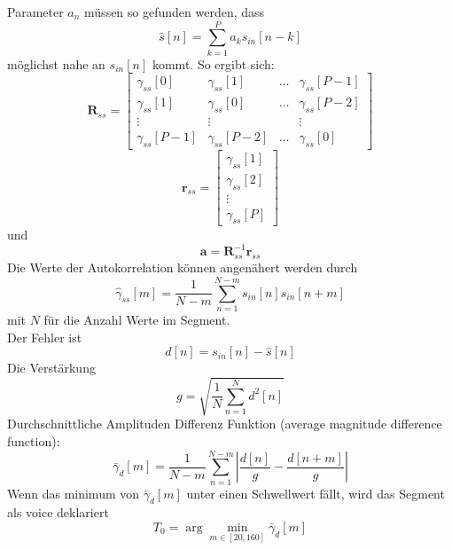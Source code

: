 Parameter $a_n$ müssen so gefunden werden, dass
\[ \hat{s}[n] = \sum_{k=1}^{P}a_ks_{in}[n-k] \]
möglichst nahe an $s_{in}[n]$ kommt. So ergibt sich:
\[ \textbf{R}_{ss} = \begin{bmatrix}
	\gamma_{ss}[0]	& \gamma_{ss}[1]	& \ldots	& \gamma_{ss}[P-1]\\
	\gamma_{ss}[1]	& \gamma_{ss}[0]	& \ldots	& \gamma_{ss}[P-2]\\
	\vdots			& \vdots			&			& \vdots\\
	\gamma_{ss}[P-1]& \gamma_{ss}[P-2]	& \ldots	& \gamma_{ss}[0]
\end{bmatrix}\]
\[ \textbf{r}_{ss} = \begin{bmatrix}
	\gamma_{ss}[1]\\
	\gamma_{ss}[2]\\
	\vdots\\
	\gamma_{ss}[P]
\end{bmatrix} \]
und
\[ \textbf{a} = \textbf{R}_{ss}^{-1}\textbf{r}_{ss} \]
Die Werte der Autokorrelation können angenähert werden durch
\[ \hat{\gamma}_{ss}[m] = \frac{1}{N-m} \sum_{n=1}^{N-m}s_{in}[n]s_{in}[n+m] \]
mit $N$ für die Anzahl Werte im Segment.\\
Der Fehler ist
\[ d[n] = s_{in}[n]-\hat{s}[n] \]
Die Verstärkung
\[ g=\sqrt{\frac{1}{N}\sum_{n=1}^{N}d^2[n]} \]
Durchschnittliche Amplituden Differenz Funktion (average magnitude difference
function):
\[ \bar{\gamma}_d[m]= \frac{1}{N-m} \sum_{n=1}^{N-m}\left|\frac{d[n]}{g} -
	\frac{d[n+m]}{g}\right| \] 
Wenn das minimum von $\bar{\gamma}_d[m]$ unter einen Schwellwert fällt, wird das
Segment als voice deklariert
\[ T_0 = \arg \min_{m\in[20,160]} \bar{\gamma}_d[m] \]

